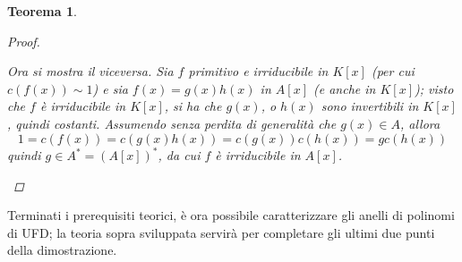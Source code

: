 \documentclass[12pt]{scrartcl}
\theoremstyle{style}
\newtheorem{teorema}{Teorema}[section]
\numberwithin{equation}{subsection}
\begin{document}
\begin{teorema}
\begin{proof}
\begin{itemize}
						Ora si mostra il viceversa. 
						Sia $f$ primitivo e irriducibile in $K[x]$ (per cui $c(f(x)) \sim 1$) e sia $f(x) = g(x) h(x) $ in $A[x]$ (e anche in $K[x]$); visto che $f$ \`e irriducibile in $K[x]$, si ha che $g(x)$, o $h(x)$ sono invertibili in $K[x]$, quindi costanti.
						Assumendo senza perdita di generalit\`a che $g(x) \in A$, allora
						\[
						1 = c(f(x)) = c(g(x) h(x)) = c(g(x)) c(h(x)) = gc(h(x))
						\] 
						quindi $g \in A^* = (A[x])^*$, da cui $f$ \`e irriducibile in $A[x]$.
				\end{itemize}
			\end{proof}
\end{teorema}
\noindent Terminati i prerequisiti teorici, \`e ora possibile caratterizzare gli anelli di polinomi di UFD; la teoria sopra sviluppata servir\`a per completare gli ultimi due punti della dimostrazione.
\end{document}
